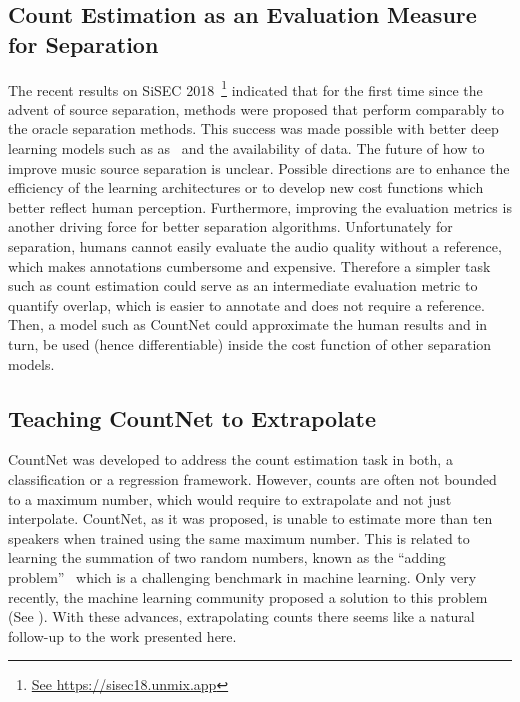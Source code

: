 \subsection*{Count Estimation as an Evaluation Measure for Separation}

The recent results on SiSEC 2018~\cite{stoeter18sisec}\footnote{\url{See https://sisec18.unmix.app}} indicated that for the first time since the advent of source separation, methods were proposed that perform comparably to the oracle separation methods.
This success was made possible with better deep learning models such as as~\cite{takahashi17} and the availability of data.
The future of how to improve music source separation is unclear. Possible directions are to enhance the efficiency of the learning architectures or to develop new cost functions which better reflect human perception.
Furthermore, improving the evaluation metrics is another driving force for better separation algorithms. Unfortunately for separation, humans cannot easily evaluate the audio quality without a reference, which makes annotations cumbersome and expensive.
Therefore a simpler task such as count estimation could serve as an intermediate evaluation metric to quantify overlap, which is easier to annotate and does not require a reference. Then, a model such as CountNet could approximate the human results and in turn, be used (hence differentiable) inside the cost function of other separation models.

\subsection*{Teaching CountNet to Extrapolate}

CountNet was developed to address the count estimation task in both, a classification or a regression framework.
However, counts are often not bounded to a maximum number, which would require to extrapolate and not just interpolate.
CountNet, as it was proposed, is unable to estimate more than ten speakers when trained using the same maximum number.
This is related to learning the summation of two random numbers, known as the ``adding problem''~\cite{Hochreiter97} which is a challenging benchmark in machine learning.
Only very recently, the machine learning community proposed a solution to this problem (See \cite{trask18}).
With these advances, extrapolating counts there seems like a natural follow-up to the work presented here.
